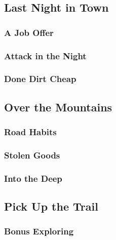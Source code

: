 

\subsection{Last Night in Town}


\subsubsection{A Job Offer}


\subsubsection{Attack in the Night}


\subsubsection{Done Dirt Cheap}


\subsection{Over the Mountains}


\subsubsection{Road Habits}


\subsubsection{Stolen Goods}


\subsubsection{Into the Deep}


\subsection{Pick Up the Trail}


\subsubsection{Bonus Exploring}


